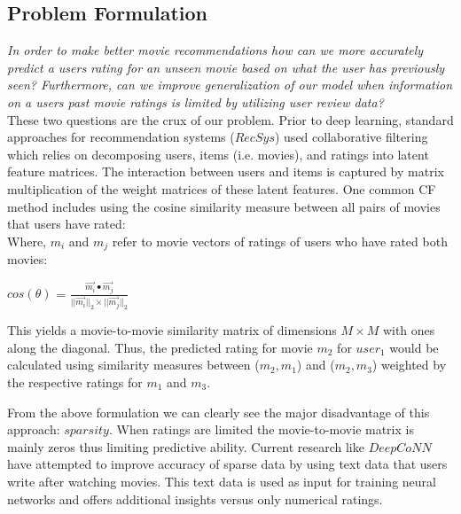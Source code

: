 \documentclass[10pt,twocolumn,letterpaper]{article}
\begin{document}
\subsection{Problem Formulation}

\textit{In order to make better movie recommendations how can we more accurately predict a users rating for an unseen movie based on what the user has previously seen? Furthermore, can we improve generalization of our model when information on a users past movie ratings is limited by utilizing user review data?}\\

These two questions are the crux of our problem. Prior to deep learning, standard approaches for recommendation systems ($RecSys$) used collaborative filtering which relies on decomposing users, items (i.e. movies), and ratings into latent feature matrices. The interaction between users and items is captured by matrix multiplication of the weight matrices of these latent features. One common CF method includes using the cosine similarity measure between all pairs of movies that users have rated:\\

Where,
$m_{i}$ and $m_{j}$ refer to movie vectors of ratings of users who have rated both movies:

\begin{center}
\textbf{$cos(\theta)$} =
$\frac{\vec{m_{i}} \bullet \vec{m_{j}}}{||\vec{m_{i}}||_2 \times ||\vec{m_{j}}||_2}$
\end{center}

This yields a movie-to-movie similarity matrix of dimensions $M \times M$ with ones along the diagonal. Thus, the predicted rating for movie $m_{2}$ for $user_1$ would be calculated using similarity measures between ($m_2,m_1$) and ($m_2,m_3$) weighted by the respective ratings for $m_1$ and $m_3$. 

From the above formulation we can clearly see the major disadvantage of this approach: $sparsity$. When ratings are limited the movie-to-movie matrix is mainly zeros thus limiting predictive ability. Current research like $DeepCoNN$ have attempted to improve accuracy of sparse data by using text data that users write after watching movies. This text data is used as input for training neural networks and offers additional insights versus only numerical ratings.
\end{document}
